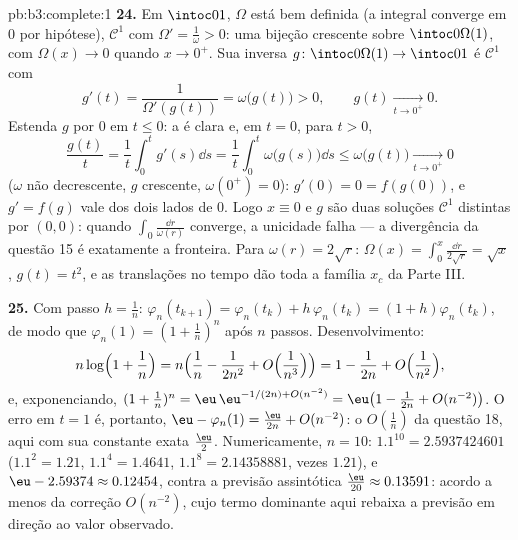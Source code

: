 \begin{solution}{pb:b3:complete:1}
\textbf{24.} Em $\intoc01$, $\Omega$ está bem definida (a
integral converge em $0$ por hipótese), $\mathcal C^1$ com
$\Omega' = \frac1\omega > 0$: uma bijeção crescente sobre
$\intoc0{\Omega(1)}$, com $\Omega(x) \to 0$ quando $x \to 0^+$.
Sua inversa $g \colon \intoc0{\Omega(1)} \to \intoc01$ é
$\mathcal C^1$ com
\[
g'(t) = \frac1{\Omega'(g(t))} = \omega\bigl(g(t)\bigr) > 0,
\qquad g(t) \xrightarrow[t \to 0^+]{} 0 .
\]
Estenda $g$ por $0$ em $t \leq 0$: a  é clara e, em
$t = 0$, para $t > 0$,
\[
\frac{g(t)}t = \frac1t\int_0^tg'(s)\dd s
= \frac1t\int_0^t\omega\bigl(g(s)\bigr)\dd s
\leq \omega\bigl(g(t)\bigr) \xrightarrow[t\to0^+]{} 0
\]
($\omega$ não decrescente, $g$ crescente, $\omega(0^+) = 0$):
$g'(0) = 0 = f(g(0))$, e $g' = f(g)$ vale dos dois lados
de $0$. Logo $x \equiv 0$ e $g$ são duas soluções $\mathcal
C^1$ distintas por $(0, 0)$: quando $\int_0\frac{\dd r}
{\omega(r)}$ converge, a unicidade falha --- a divergência da questão 15 é
exatamente a fronteira. Para $\omega(r) = 2\sqrt
r$: $\Omega(x) = \int_0^x\frac{\dd r}{2\sqrt r} = \sqrt x$,
$g(t) = t^2$, e as translações no tempo dão toda a família
$x_c$ da Parte III.

\textbf{25.} Com passo $h = \frac1n$: $\varphi_n(t_{k+1}) =
\varphi_n(t_k) + h\,\varphi_n(t_k) = (1 + h)\varphi_n(t_k)$,
de modo que $\varphi_n(1) = (1 + \frac1n)^n$ após $n$ passos.
Desenvolvimento:
\[
n\log\Bigl(1 + \frac1n\Bigr)
= n\Bigl(\frac1n - \frac1{2n^2} + O\Bigl(\frac1{n^3}\Bigr)
\Bigr) = 1 - \frac1{2n} + O\Bigl(\frac1{n^2}\Bigr),
\]
e, exponenciando, $(1 + \frac1n)^n = \eu\,\eu^{-1/(2n) +
O(n^{-2})} = \eu\bigl(1 - \frac1{2n} + O(n^{-2})\bigr)$. O
erro em $t = 1$ é, portanto, $\eu - \varphi_n(1) =
\frac{\eu}{2n} + O(n^{-2})$: o $O(\frac1n)$ da questão 18,
aqui com sua constante exata $\frac\eu2$. Numericamente, $n =
10$: $1.1^{10} = 2.5937424601$ ($1.1^2 = 1.21$, $1.1^4 =
1.4641$, $1.1^8 = 2.14358881$, vezes $1.21$), e $\eu -
2.59374 \approx 0.12454$, contra a previsão assintótica
$\frac{\eu}{20} \approx 0.13591$: acordo a menos da correção
$O(n^{-2})$, cujo termo dominante aqui rebaixa a
previsão em direção ao valor observado.
\end{solution}
